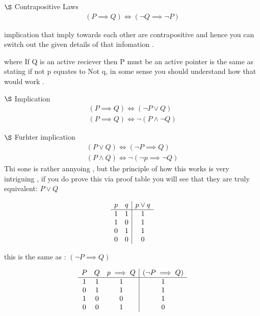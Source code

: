 \documentclass{article}
\theoremstyle{mytheoremstyle}
\theoremstyle{mytheoremstyle}
\theoremstyle{myproblemstyle}
\begin{document}
\item $\S$ Contrapositive Laws
\[\begin{array}{c}
		(P \implies Q) \iff (\neg Q \implies \neg P)
	\end{array} \]

implication that imply towards each other are contrapositive and hence you can switch out the given details of that infomation .

where If Q is an active reciever then P must be an active pointer is the same as stating if not p equates to Not q, in some sense you should understand how that would work .

\item $\S$  Implication
\[\begin{array}{c}
		(P \implies Q) \iff (\neg P \lor Q) \\
		(P \implies Q) \iff \neg(P \land \neg Q)
	\end{array}\]

\item  $\S$ Furhter implication
\[\begin{array}{c}
		(P \lor Q) \iff (\neg P \implies Q) \\
		(P \land Q) \iff \neg(\neg p \implies \neg Q)
	\end{array}\]
Thi sone is rather annyoing , but the principle of how this works is very intriguing , if you do prove this via proof table you will see that they are truly equivalent:
$P \lor Q$

\[\begin{array}{c c | c}
		p & q & p \lor q \\
		\hline
		1 & 1 & 1        \\
		1 & 0 & 1        \\
		0 & 1 & 1        \\
		0 & 0 & 0        \\
	\end{array}\]



this is the same as :
$(\neg P \implies Q) $


\[\begin{array}{c c c | c}
		P & Q & p \implies Q & (\neg P \implies Q) \\
		\hline
		1 & 1 & 1            & 1                   \\
		0 & 1 & 1            & 1                   \\
		1 & 0 & 0            & 1                   \\
		0 & 0 & 1            & 0                   \\
	\end{array}\]
\end{document}
